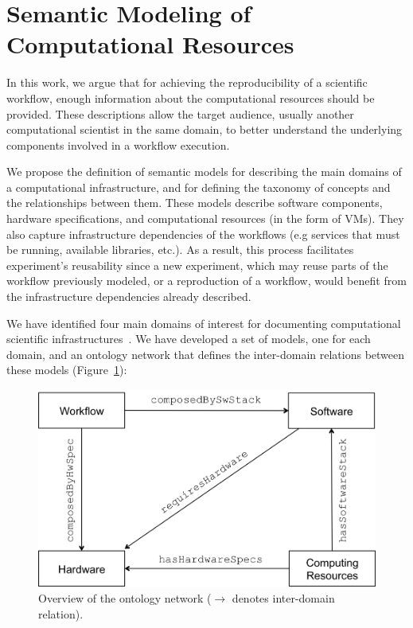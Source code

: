 \section{Semantic Modeling of Computational Resources}
\label{sec:semantic}





In this work, we argue that for achieving the reproducibility of a scientific workflow, enough information 
about the computational resources should be provided. These descriptions allow the target audience, 
usually another computational scientist in the same domain, to better understand the underlying 
components involved in a workflow execution.

We propose the definition of semantic models for describing the main domains of a 
computational infrastructure, and for defining the taxonomy of concepts and the relationships 
between them. These models describe software components, hardware specifications, 
and computational resources (in the form of VMs). They also capture infrastructure 
dependencies of the workflows (e.g services that must be running, available libraries, etc.).
 As a result, this process facilitates experiment's reusability since 
a new experiment, which may reuse parts of the workflow previously modeled, or a reproduction 
of a workflow, would benefit from the infrastructure dependencies already described.

We have identified four main domains of interest for documenting computational scientific 
infrastructures~\cite{wicus}. We have developed a set of models, one for each domain, 
and an ontology network that defines the inter-domain relations between these models 
(Figure~\ref{fig:wicusrels}):

\begin{figure}[!b]
	\centering
	\includegraphics[width=.9\linewidth]{figures/wicusrels}
	\caption{Overview of the ontology network ($\rightarrow$ denotes inter-domain relation).}
	\label{fig:wicusrels}
\end{figure}

